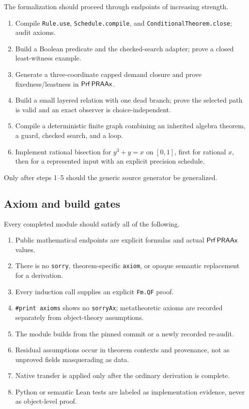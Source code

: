 The formalization should proceed through endpoints of increasing strength.
\begin{enumerate}[label=(\arabic*)]
  \item Compile \texttt{Rule.use}, \texttt{Schedule.compile}, and \texttt{ConditionalTheorem.close}; audit axioms.
  \item Build a Boolean predicate and the checked-search adapter; prove a closed least-witness example.
  \item Generate a three-coordinate capped demand closure and prove fixedness/leastness in \(\mathsf{Prf}\,\mathsf{PRAAx}\).
  \item Build a small layered relation with one dead branch; prove the selected path is valid and an exact observer is choice-independent.
  \item Compile a deterministic finite graph combining an inherited algebra theorem, a guard, checked search, and a loop.
  \item Implement rational bisection for \(y^3+y=x\) on \([0,1]\), first for rational \(x\), then for a represented input with an explicit precision schedule.
\end{enumerate}
Only after steps 1--5 should the generic source generator be generalized.

\subsection{Axiom and build gates}

Every completed module should satisfy all of the following.
\begin{enumerate}[label=(\arabic*)]
  \item Public mathematical endpoints are explicit formulas and actual \(\mathsf{Prf}\,\mathsf{PRAAx}\) values.
  \item There is no \texttt{sorry}, theorem-specific \texttt{axiom}, or opaque semantic replacement for a derivation.
  \item Every induction call supplies an explicit \texttt{Fm.QF} proof.
  \item \texttt{\#print axioms} shows no \texttt{sorryAx}; metatheoretic axioms are recorded separately from object-theory assumptions.
  \item The module builds from the pinned commit or a newly recorded re-audit.
  \item Residual assumptions occur in theorem contexts and provenance, not as unproved fields masquerading as data.
  \item Native transfer is applied only after the ordinary derivation is complete.
  \item Python or semantic Lean tests are labeled as implementation evidence, never as object-level proof.
\end{enumerate}
